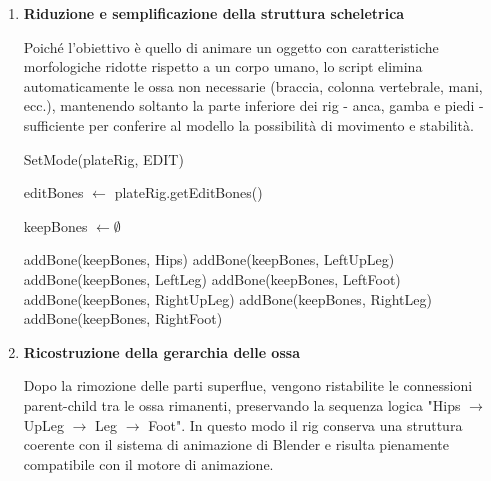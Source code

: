 \begin{enumerate}
\begin{minipage}{1\linewidth}
\begin{algorithm}[H]
    setActiveObject(plateRig)\;
    
    \end{algorithm}
    \end{minipage}

    
    \item \textbf{Riduzione e semplificazione della struttura scheletrica}

    Poiché l'obiettivo è quello di animare un oggetto con caratteristiche morfologiche ridotte rispetto a un corpo umano, lo script elimina automaticamente le ossa non necessarie (braccia, colonna vertebrale, mani, ecc.), mantenendo soltanto la parte inferiore dei rig - anca, gamba e piedi - sufficiente per conferire al modello la possibilità di movimento e stabilità.
    \vspace{5mm} %

    \vspace{5mm}
    \begin{minipage}{1\linewidth}
    \begin{algorithm}[H]
    \caption{KeepLowerBodyBones}
    \label{alg:keep_lower_body}
    
    
    SetMode(plateRig, EDIT)\;
    
    editBones $\leftarrow$ plateRig.getEditBones()\;
    
    keepBones $\leftarrow \emptyset$\;
    
    addBone(keepBones, Hips)\;
    addBone(keepBones, LeftUpLeg)\;
    addBone(keepBones, LeftLeg)\;
    addBone(keepBones, LeftFoot)\;
    addBone(keepBones, RightUpLeg)\;
    addBone(keepBones, RightLeg)\;
    addBone(keepBones, RightFoot)\;
    
    \end{algorithm}
    \end{minipage}


    \vspace{5mm} %
    \item \textbf{Ricostruzione della gerarchia delle ossa}

    Dopo la rimozione delle parti superflue, vengono ristabilite le connessioni parent-child tra le ossa rimanenti, preservando la sequenza logica "Hips $\rightarrow$ UpLeg $\rightarrow$ Leg $\rightarrow$ Foot". In questo modo il rig conserva una struttura coerente con il sistema di animazione di Blender e risulta pienamente compatibile con il motore di animazione.


\end{enumerate}
